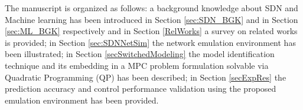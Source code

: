
The manuscript is organized as follows: a background knowledge about SDN and Machine learning has been introduced in Section \ref{sec:SDN_BGK} and in Section \ref{sec:ML_BGK} respectively and in Section \ref{RelWorks} a survey on related works is provided; in Section \ref{sec:SDNNetSim} the network emulation environment has been illustrated; in Section \ref{secSwitchedModeling} the model identification technique and its embedding in a MPC problem formulation solvable via Quadratic Programming (QP) has been described; in Section \ref{secExpRes} the prediction accuracy and control performance validation using the proposed emulation environment has been provided.


